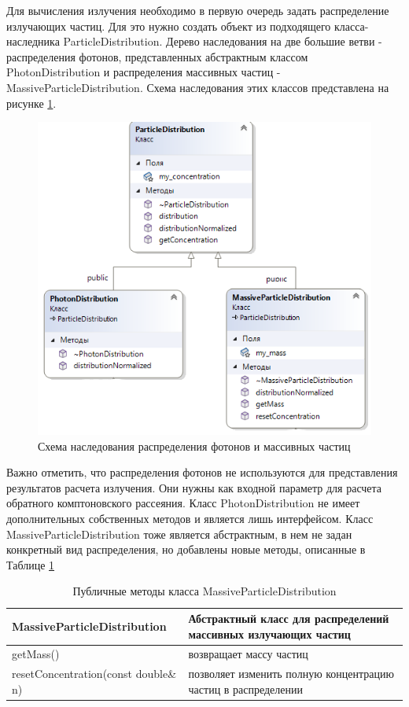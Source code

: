 Для вычисления излучения необходимо в первую очередь задать распределение излучающих частиц. Для это нужно создать объект из подходящего класса-наследника ParticleDistribution. Дерево наследования на две большие ветви - распределения фотонов, представленных абстрактным классом PhotonDistribution и распределения массивных частиц - MassiveParticleDistribution. Схема наследования этих классов представлена на рисунке \ref{particleDistribution0}. 

\begin{figure}
	\centering
	\includegraphics[width=9.5 cm]{./fig/particleDistribution0.png} 
	\caption{Схема наследования распределения фотонов и массивных частиц}
	\label{particleDistribution0}
\end{figure}

Важно отметить, что распределения фотонов не используются для представления результатов расчета излучения. Они нужны как входной параметр для расчета обратного комптоновского рассеяния. Класс PhotonDistribution не имеет дополнительных собственных методов и является лишь интерфейсом. Класс MassiveParticleDistribution тоже является абстрактным, в нем не задан конкретный вид распределения, но добавлены новые методы, описанные в Таблице \ref{MassiveParticleDistribution}	
\begin{table}
	\begin{center}
		\caption{Публичные методы класса MassiveParticleDistribution }
		\label{MassiveParticleDistribution}
		\begin{small}
			\begin{tabularx}{\textwidth}{|X|X|}
				\hline
				\textbf{MassiveParticleDistribution} & Абстрактный класс для распределений массивных излучающих частиц\\
				\hline
				getMass() & возвращает массу частиц \\
				\hline
				resetConcentration(const double\& n) & позволяет изменить полную концентрацию частиц в распределении\\
				\hline
			\end{tabularx}
		\end{small}
	\end{center}
\end{table}

